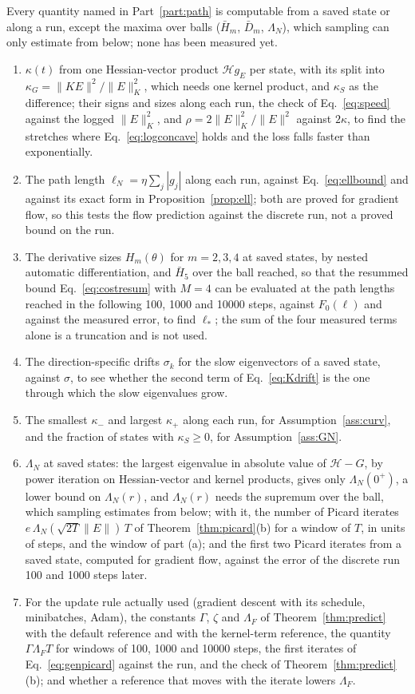 \documentclass[11pt]{article}
\theoremstyle{definition}
\theoremstyle{remark}
\newcommand{\Hess}{\mathcal{H}}          %
\begin{document}
Every quantity named in Part~\ref{part:path} is computable from a saved state or along a run, except the maxima over balls ($\bar H_m$, $\bar D_m$, $\Lambda_N$), which sampling can only estimate from below; none has been measured yet.
\begin{enumerate}[label=(\arabic*)]
\item $\kappa(t)$ from one Hessian-vector product $\Hess g_E$ per state, with its split into $\kappa_G = \|KE\|^2/\|E\|_K^2$, which needs one kernel product, and $\kappa_S$ as the difference; their signs and sizes along each run, the check of Eq.~\eqref{eq:speed} against the logged $\|E\|_K^2$, and $\rho = 2\|E\|_K^2/\|E\|^2$ against $2\kappa$, to find the stretches where Eq.~\eqref{eq:logconcave} holds and the loss falls faster than exponentially.
\item The path length $\ell_N = \eta\sum_j|g_j|$ along each run, against Eq.~\eqref{eq:ellbound} and against its exact form in Proposition~\ref{prop:ell}; both are proved for gradient flow, so this tests the flow prediction against the discrete run, not a proved bound on the run.
\item The derivative sizes $H_m(\theta)$ for $m = 2, 3, 4$ at saved states, by nested automatic differentiation, and $\bar H_5$ over the ball reached, so that the resummed bound Eq.~\eqref{eq:costresum} with $M = 4$ can be evaluated at the path lengths reached in the following 100, 1000 and 10000 steps, against $F_0(\ell)$ and against the measured error, to find $\ell_\ast$; the sum of the four measured terms alone is a truncation and is not used.
\item The direction-specific drifts $\sigma_k$ for the slow eigenvectors of a saved state, against $\sigma$, to see whether the second term of Eq.~\eqref{eq:Kdrift} is the one through which the slow eigenvalues grow.
\item The smallest $\kappa_-$ and largest $\kappa_+$ along each run, for Assumption~\ref{ass:curv}, and the fraction of states with $\kappa_S\ge0$, for Assumption~\ref{ass:GN}.
\item $\Lambda_N$ at saved states: the largest eigenvalue in absolute value of $\Hess - G$, by power iteration on Hessian-vector and kernel products, gives only $\Lambda_N(0^+)$, a lower bound on $\Lambda_N(r)$, and $\Lambda_N(r)$ needs the supremum over the ball, which sampling estimates from below; with it, the number of Picard iterates $e\,\Lambda_N(\sqrt{2T}\|E\|)\,T$ of Theorem~\ref{thm:picard}(b) for a window of $T$, in units of steps, and the window of part (a); and the first two Picard iterates from a saved state, computed for gradient flow, against the error of the discrete run 100 and 1000 steps later.
\item For the update rule actually used (gradient descent with its schedule, minibatches, Adam), the constants $\Gamma$, $\zeta$ and $\Lambda_F$ of Theorem~\ref{thm:predict} with the default reference and with the kernel-term reference, the quantity $\Gamma\Lambda_FT$ for windows of 100, 1000 and 10000 steps, the first iterates of Eq.~\eqref{eq:genpicard} against the run, and the check of Theorem~\ref{thm:predict}(b); and whether a reference that moves with the iterate lowers $\Lambda_F$.
\end{enumerate}
\end{document}
